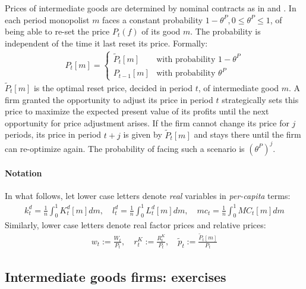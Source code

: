 Prices of intermediate goods are determined by nominal contracts as in \textcite{Calvo_1983_StaggeredPricesUtilitymaximizing} and \textcite{Yun_1996_NominalPriceRigidity}.
In each period monopolist \(m\) faces a constant probability \(1-\theta^{P}, 0\leq \theta^{P} \leq 1\),
  of being able to re-set the price \(P_{t}(f)\) of its good \(m\).
The probability is independent of the time it last reset its price.
Formally:
\begin{align}
P_{t}[m] = \begin{cases}
\widetilde{P}_{t}[m] & \text{with probability } 1-\theta^{P}\\
P_{t-1}[m] & \text{with probability } \theta^{P}
\end{cases}
\label{eq:NewKeynesian.CalvoMechanism}
\end{align}
\(\widetilde{P}_{t}[m]\) is the optimal reset price, decided in period \(t\), of intermediate good \(m\).
A firm granted the opportunity to adjust its price in period \(t\) strategically sets this price
  to maximize the expected present value of its profits until the next opportunity for price adjustment arises.
If the firm cannot change its price for \(j\) periods,
  its price in period \(t+j\) is given by \(\widetilde{P}_{t}[m]\)
  and stays there until the firm can re-optimize again.
The probability of facing such a scenario is \({(\theta^{P})}^{j}\).


\paragraph{Notation}
In what follows, let lower case letters denote \emph{real} variables in \emph{per-capita} terms:
\begin{align*}
k^{d}_{t} = \frac{1}{n} \int_{0}^{1} K^{d}_{t}[m] dm
,\quad
l^{d}_{t} = \frac{1}{n} \int_{0}^{1} L^{d}_{t}[m] dm
,\quad
{mc}_{t} = \frac{1}{n} \int_{0}^{1} {MC}_{t}[m] dm
\end{align*}
Similarly, lower case letters denote real factor prices and relative prices:
\begin{align*}
w_{t} := \frac{W_{t}}{P_{t}}
,\quad
r^{K}_{t} := \frac{R^{K}_{t}}{P_{t}}
,\quad
\widetilde{p}_{t} := \frac{\widetilde{P}_{t}[m]}{P_{t}}
\end{align*}

\subsection{Intermediate goods firms: exercises}

